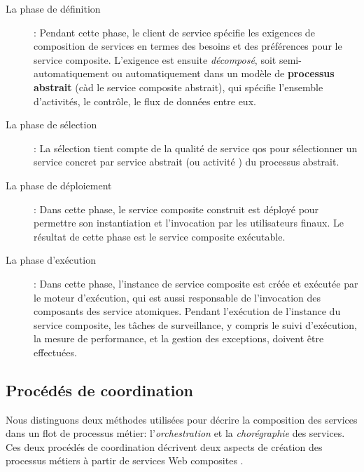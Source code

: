  

  \renewcommand{\descriptionlabel}[1]{\hspace{0.5cm}\textbullet~\textsf{#1}}
  \begin{description}
  \item[La phase de définition]: Pendant cette phase, le client de
    service spécifie les exigences de composition de services en
    termes des besoins et des préférences pour le service
    composite. L'exigence est ensuite \textit{décomposé}, soit
    semi-automatiquement ou automatiquement dans un modèle de
    \textbf{processus abstrait} (càd le service composite abstrait),
    qui spécifie l'ensemble d'activités, le contrôle, le flux de
    données entre eux.\\

  \item[La phase de sélection]: La sélection tient compte de la
    qualité de service \acrshort{qos} pour sélectionner un service
    concret par service abstrait (ou activité ) du processus abstrait.

  \item[La phase de déploiement]: Dans cette phase, le service
    composite construit est déployé pour permettre son instantiation
    et l'invocation par les utilisateurs finaux. Le résultat de cette
    phase est le service composite exécutable.

  \item[La phase d'exécution]: Dans cette phase, l'instance de service
    composite est créée et exécutée par le moteur d'exécution, qui est
    aussi responsable de l'invocation des composants des service
    atomiques. Pendant l'exécution de l'instance du service composite,
    les tâches de surveillance, y compris le suivi d'exécution, la mesure
    de performance, et la gestion des exceptions, doivent être
    effectuées.
  \end{description}
  \enddescription

  \subsection{Procédés de coordination}
  \label{sec:proc-de-coord}
  Nous distinguons deux méthodes utilisées pour décrire la composition
  des services dans un flot de processus métier: l'\emph{orchestration}
   et la \emph{chorégraphie} des services. Ces deux
  procédés de coordination décrivent deux aspects de création des
  processus métiers à partir de services Web composites
  \cite{peltz2003web}.\medskip

